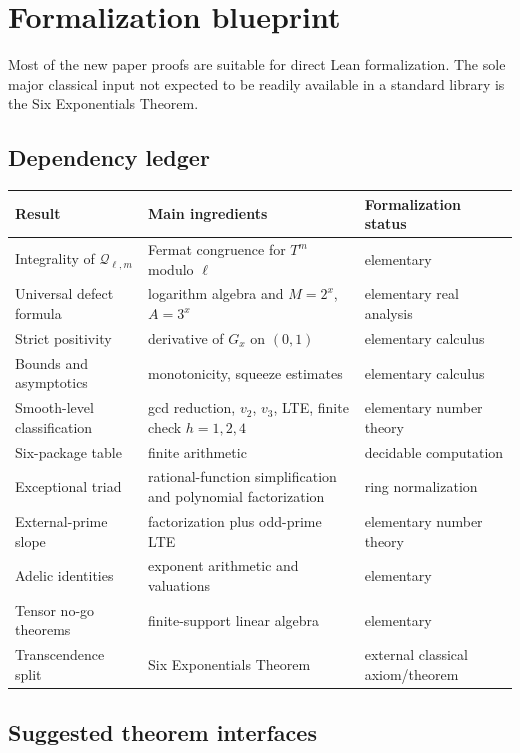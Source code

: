 \documentclass[11pt]{article}
\numberwithin{equation}{section}
\theoremstyle{definition}
\theoremstyle{remark}
\begin{document}
\section{Formalization blueprint}

Most of the new paper proofs are suitable for direct Lean formalization.  The sole major classical input not expected to be readily available in a standard library is the Six Exponentials Theorem.

\subsection{Dependency ledger}

\begin{center}
\begin{longtable}{p{}p{}p{}}
\toprule
Result & Main ingredients & Formalization status\\
\midrule
\endhead
Integrality of $\mathcal Q_{\ell,m}$ & Fermat congruence for $T^m$ modulo $\ell$ & elementary\\
Universal defect formula & logarithm algebra and $M=2^x$, $A=3^x$ & elementary real analysis\\
Strict positivity & derivative of $G_x$ on $(0,1)$ & elementary calculus\\
Bounds and asymptotics & monotonicity, squeeze estimates & elementary calculus\\
Smooth-level classification & gcd reduction, $v_2$, $v_3$, LTE, finite check $h=1,2,4$ & elementary number theory\\
Six-package table & finite arithmetic & decidable computation\\
Exceptional triad & rational-function simplification and polynomial factorization & ring normalization\\
External-prime slope & factorization plus odd-prime LTE & elementary number theory\\
Adelic identities & exponent arithmetic and valuations & elementary\\
Tensor no-go theorems & finite-support linear algebra & elementary\\
Transcendence split & Six Exponentials Theorem & external classical axiom/theorem\\
\bottomrule
\end{longtable}
\end{center}

\subsection{Suggested theorem interfaces}
\end{document}
